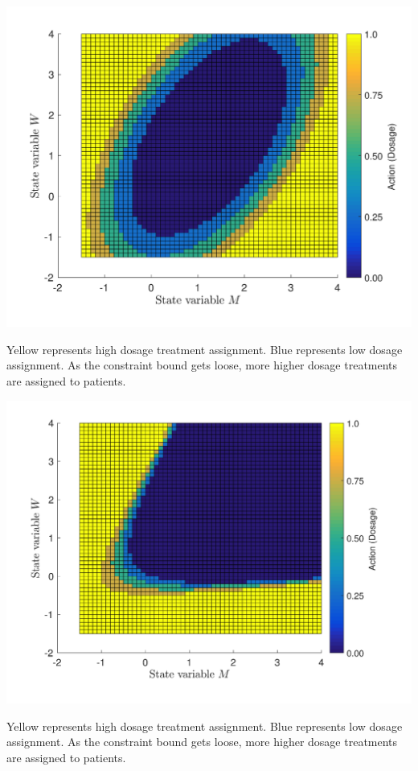 	\begin{minipage}{0.95\linewidth}
		\includegraphics[width=\linewidth]{./Chapter-3/figs/action_nu5.png}
		\caption*{Yellow represents high dosage treatment assignment. Blue represents low dosage assignment. As the constraint bound gets loose, more higher dosage treatments are assigned to patients.}
	\end{minipage}
	\newpage
	\begin{minipage}{0.95\linewidth}
		\includegraphics[width=\linewidth]{./Chapter-3/figs/action_nu10.png}
		\caption*{Yellow represents high dosage treatment assignment. Blue represents low dosage assignment. As the constraint bound gets loose, more higher dosage treatments are assigned to patients.}
	\end{minipage}
